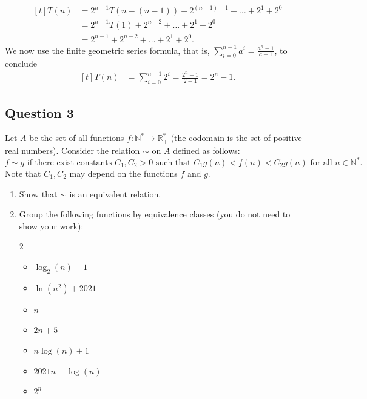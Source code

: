 \documentclass{article}
\begin{document}
\begin{enumerate}
$$\begin{aligned}[t]
            T(n) &= 2^{n - 1}T(n - (n - 1)) + 2^{(n - 1) - 1} + \dots + 2^{1} + 2^{0} \\
            &= 2^{n - 1}T(1) + 2^{n - 2} + \dots + 2^{1} + 2^{0} \\
            &= 2^{n - 1} + 2^{n - 2} + \dots + 2^{1} + 2^{0}.
        \end{aligned}$$
        We now use the finite geometric series formula, that is, $\sum_{i = 0}^{n - 1} a^{i} = \frac{a^{n} - 1}{a - 1}$, to conclude 
        $$\begin{aligned}[t]
            T(n) &= \sum_{i = 0}^{n - 1} 2^{i} = \frac{2^{n} - 1}{2 - 1} = 2^{n} - 1.
        \end{aligned}$$
    \end{enumerate}

\subsection*{Question 3}
    Let $A$ be the set of all functions $f: \mathbb{N}^{*} \rightarrow \mathbb{R}^{*}_{+}$ (the codomain is the set of positive real numbers). Consider the relation $\sim$ on $A$ defined as follows: $$\text{$f \sim g$ if there exist constants $C_{1}, C_{2} > 0$ such that $C_{1}g(n) < f(n) < C_{2}g(n)$ for all $n \in \mathbb{N}^{*}$.}$$ Note that $C_{1}, C_{2}$ may depend on the functions $f$ and $g$.
    \begin{enumerate}
        \item Show that $\sim$ is an equivalent relation.
        \item Group the following functions by equivalence classes (you do not need to show your work): 
        \begin{multicols}{2}
        \begin{itemize}
            \item $\log_{2}(n) + 1$
            \item $\ln(n^{2}) + 2021$
            \item $n$
            \item $2n + 5$
            \item $n\log(n) + 1$
            \item $2021n + \log(n)$
            \item $2^{n}$
        \end{itemize}
        \end{multicols}
    \end{enumerate}
\end{document}
